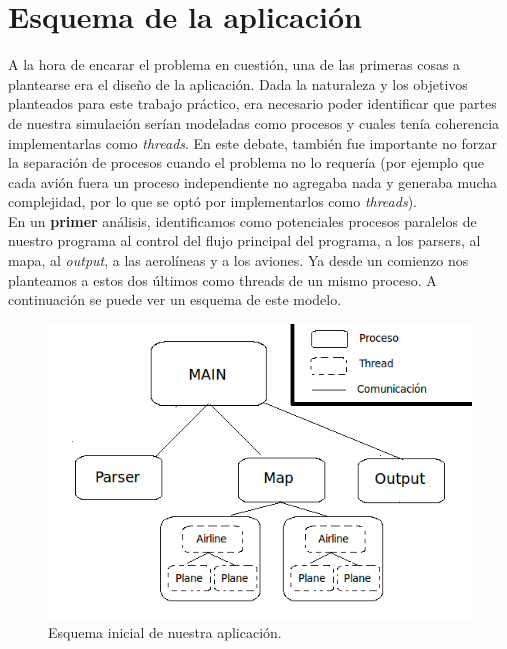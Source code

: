 \documentclass[a4paper,10pt]{article}
\begin{document}
\newpage
\section{Esquema de la aplicación}

A la hora de encarar el problema en cuestión, una de las primeras cosas a plantearse era el diseño de la aplicación. Dada la naturaleza y los objetivos planteados 
para este trabajo práctico, era necesario poder identificar que partes de nuestra simulación serían modeladas como procesos y cuales tenía coherencia implementarlas 
como \textit{threads}. En este debate, también fue importante no forzar la separación de procesos cuando el problema no lo requería (por ejemplo que cada avión 
fuera un proceso independiente no agregaba nada y generaba mucha complejidad, por lo que se optó por implementarlos como \textit{threads}).\\ 

En un \textbf{primer} análisis, identificamos como potenciales procesos paralelos de nuestro programa al control del flujo principal del programa, a los parsers, 
al mapa, al \textit{output}, a las aerolíneas y a los aviones. Ya desde un comienzo nos planteamos a estos
dos últimos como threads de un mismo proceso. A continuación se puede ver un esquema de este modelo.\\

\begin{figure}[H]
\begin{center}
 \includegraphics[scale=0.6]{./images/Diagrama_simulacion_2.png}
 \caption{Esquema inicial de nuestra aplicación.}
\end{center}
\end{figure}
\end{document}

